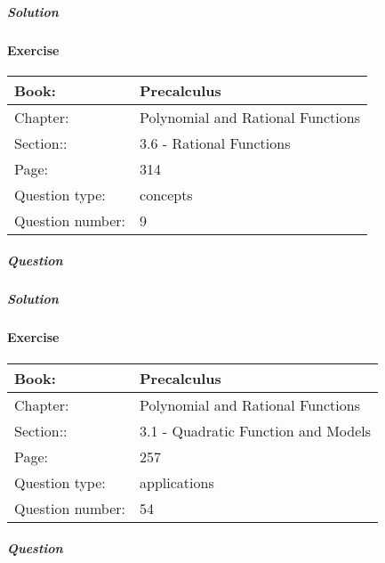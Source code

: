\documentclass{article}
\begin{document}
            \subparagraph{Solution}
            
            
            \newpage
            \paragraph{Exercise}\par
            \noindent
            \begin{tabularx}{1\textwidth}{
                    p{}
                    p{}
                }
                \toprule
                Book: & Precalculus
                \\
                \midrule
                Chapter: & Polynomial and Rational Functions
                \\
                \midrule
                Section:: & 3.6 - Rational Functions
                \\
                \midrule
                Page: & 314
                \\
                \midrule
                Question type: & concepts
                \\
                \midrule
                Question number: & 9
                \\
                \bottomrule
            \end{tabularx}
            \subparagraph{Question}
            
            \subparagraph{Solution}
            
            
            \newpage
            \paragraph{Exercise}\par
            \noindent
            \begin{tabularx}{1\textwidth}{
                    p{}
                    p{}
                }
                \toprule
                Book: & Precalculus
                \\
                \midrule
                Chapter: & Polynomial and Rational Functions
                \\
                \midrule
                Section:: & 3.1 - Quadratic Function and Models
                \\
                \midrule
                Page: & 257
                \\
                \midrule
                Question type: & applications
                \\
                \midrule
                Question number: & 54
                \\
                \bottomrule
            \end{tabularx}
            \subparagraph{Question}
            
\end{document}
